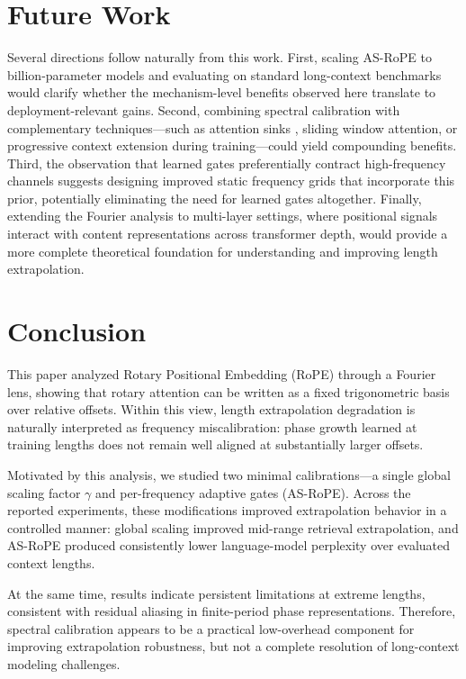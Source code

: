 \documentclass[conference]{IEEEtran}
\begin{document}
\section{Future Work}
Several directions follow naturally from this work. First, scaling AS-RoPE to billion-parameter models and evaluating on standard long-context benchmarks would clarify whether the mechanism-level benefits observed here translate to deployment-relevant gains. Second, combining spectral calibration with complementary techniques---such as attention sinks \cite{xiao2024efficient}, sliding window attention, or progressive context extension during training---could yield compounding benefits. Third, the observation that learned gates preferentially contract high-frequency channels suggests designing improved static frequency grids that incorporate this prior, potentially eliminating the need for learned gates altogether. Finally, extending the Fourier analysis to multi-layer settings, where positional signals interact with content representations across transformer depth, would provide a more complete theoretical foundation for understanding and improving length extrapolation.

\section{Conclusion}
This paper analyzed Rotary Positional Embedding (RoPE) through a Fourier lens, showing that rotary attention can be written as a fixed trigonometric basis over relative offsets. Within this view, length extrapolation degradation is naturally interpreted as frequency miscalibration: phase growth learned at training lengths does not remain well aligned at substantially larger offsets.

Motivated by this analysis, we studied two minimal calibrations---a single global scaling factor $\gamma$ and per-frequency adaptive gates (AS-RoPE). Across the reported experiments, these modifications improved extrapolation behavior in a controlled manner: global scaling improved mid-range retrieval extrapolation, and AS-RoPE produced consistently lower language-model perplexity over evaluated context lengths.

At the same time, results indicate persistent limitations at extreme lengths, consistent with residual aliasing in finite-period phase representations. Therefore, spectral calibration appears to be a practical low-overhead component for improving extrapolation robustness, but not a complete resolution of long-context modeling challenges.
\end{document}
